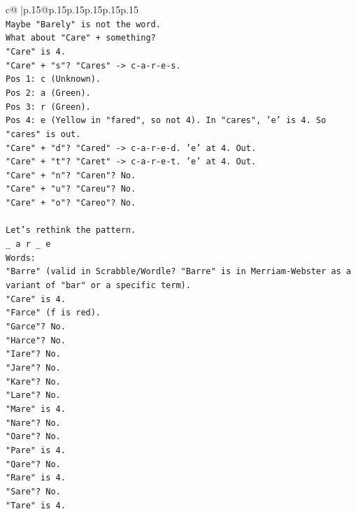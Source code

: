 \documentclass{article}
\begin{document}
{\begin{supertabular}{c@{$\;$}|p{.15\linewidth}@{}p{.15\linewidth}p{.15\linewidth}p{.15\linewidth}p{.15\linewidth}p{.15\linewidth}}
{{{\\ 
\texttt{Maybe "Barely" is not the word.} \\
\texttt{What about "Care" + something?} \\
\texttt{"Care" is 4.} \\
\texttt{"Care" + "s"? "Cares" {-}> c{-}a{-}r{-}e{-}s.} \\
\texttt{Pos 1: c (Unknown).} \\
\texttt{Pos 2: a (Green).} \\
\texttt{Pos 3: r (Green).} \\
\texttt{Pos 4: e (Yellow in "fared", so not 4). In "cares", 'e' is 4. So "cares" is out.} \\
\texttt{"Care" + "d"? "Cared" {-}> c{-}a{-}r{-}e{-}d. 'e' at 4. Out.} \\
\texttt{"Care" + "t"? "Caret" {-}> c{-}a{-}r{-}e{-}t. 'e' at 4. Out.} \\
\texttt{"Care" + "n"? "Caren"? No.} \\
\texttt{"Care" + "u"? "Careu"? No.} \\
\texttt{"Care" + "o"? "Careo"? No.} \\
\\ 
\texttt{Let's rethink the pattern.} \\
\texttt{\_ a r \_ e} \\
\texttt{Words:} \\
\texttt{"Barre" (valid in Scrabble/Wordle? "Barre" is in Merriam{-}Webster as a variant of "bar" or a specific term).} \\
\texttt{"Care" is 4.} \\
\texttt{"Farce" (f is red).} \\
\texttt{"Garce"? No.} \\
\texttt{"Harce"? No.} \\
\texttt{"Iare"? No.} \\
\texttt{"Jare"? No.} \\
\texttt{"Kare"? No.} \\
\texttt{"Lare"? No.} \\
\texttt{"Mare" is 4.} \\
\texttt{"Nare"? No.} \\
\texttt{"Oare"? No.} \\
\texttt{"Pare" is 4.} \\
\texttt{"Qare"? No.} \\
\texttt{"Rare" is 4.} \\
\texttt{"Sare"? No.} \\
\texttt{"Tare" is 4.} \\
}}}
\end{supertabular}}
\end{document}
